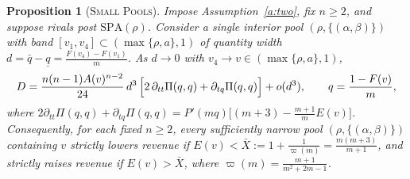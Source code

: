 \documentclass[12pt]{article}
\theoremstyle{mystyle}
\newtheorem{proposition}{Proposition}
\theoremstyle{mystyle2}
\newcommand{\SPA}{\mathrm{SPA}}
\newcommand{\1}{\mathbf{1}}
\begin{document}
\begin{proposition}[\textsc{Small Pools}]\label{prop:smallpool}
Impose Assumption~\ref{a:two}, fix $n\ge 2$, and suppose rivals post $\SPA(\rho)$. Consider a single interior pool $(\rho,\{(\alpha,\beta)\})$ with band $[v_1,v_4]\subset(\max\{\rho,a\},1)$ of quantity width $d=\bar q-\underline q=\frac{F(v_4)-F(v_1)}{m}$. As $d\to 0$ with $v_4\to v\in(\max\{\rho,a\},1)$,
\begin{equation}\label{eq:smallpool}
D = \frac{n(n-1)A(v)^{n-2}}{24}\,d^3\,\Bigl[2\,\partial_{tt}\Pi(q,q) + \partial_{tq}\Pi(q,q)\Bigr] + o(d^3), \qquad q=\frac{1-F(v)}{m},
\end{equation}
where $2\partial_{tt}\Pi(q,q)+\partial_{tq}\Pi(q,q)=P'(mq)\bigl[(m+3)-\frac{m+1}{m}E(v)\bigr]$. Consequently, for each fixed $n\ge 2$, every sufficiently narrow pool $(\rho,\{(\alpha,\beta)\})$ containing $v$ strictly lowers revenue if $E(v)<\bar X:=1+\frac{1}{\varpi(m)}=\frac{m(m+3)}{m+1}$, and strictly raises revenue if $E(v)>\bar X$, where $\varpi(m)=\frac{m+1}{m^2+2m-1}$.
\end{proposition}
\end{document}

